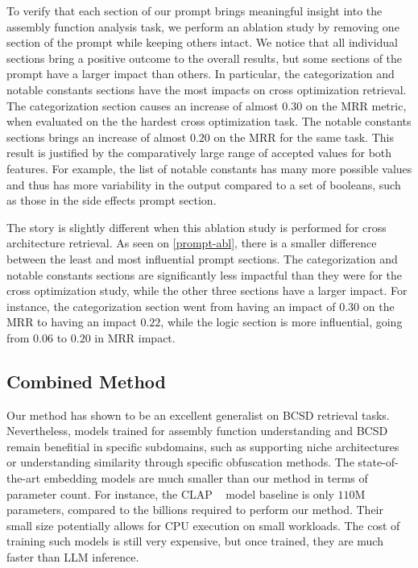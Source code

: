 To verify that each section of our prompt brings meaningful insight into the assembly function analysis task, we perform an ablation
study by removing one section of the prompt while keeping others intact. We notice that all individual sections bring a positive
outcome to the overall results, but some sections of the prompt have a larger impact than others. In particular, the categorization and
notable constants sections have the most impacts on cross optimization retrieval. The categorization section causes an increase of almost
\(0.30\) on the MRR metric, when evaluated on the the hardest cross optimization task. The notable constants sections brings an increase of
almost \(0.20\) on the MRR for the same task. This result is justified by the comparatively large range of accepted values for both features.
For example, the list of notable constants has many more possible values and thus has more variability in the output compared to a set
of booleans, such as those in the side effects prompt section.

The story is slightly different when this ablation study is performed for cross architecture retrieval. As seen on \autoref{prompt-abl},
there is a smaller difference between the least and most influential prompt sections. The categorization and notable constants sections
are significantly less impactful than they were for the cross optimization study, while the other three sections have a larger impact.
For instance, the categorization section went from having an impact of \(0.30\) on the MRR to having an impact \(0.22\), while the logic
section is more influential, going from \(0.06\) to \(0.20\) in MRR impact.

\subsection{Combined Method}

Our method has shown to be an excellent generalist on BCSD retrieval tasks. Nevertheless, models trained for assembly function understanding
and BCSD remain benefitial in specific subdomains, such as supporting niche architectures or understanding similarity through
specific obfuscation methods. The state-of-the-art embedding models are much smaller than our method in terms of parameter count.
For instance, the CLAP ~\cite{CLAP} model baseline is only \(110\)M parameters, compared to the billions required to perform our method.
Their small size potentially allows for CPU execution on small workloads. The cost of training such models is still very expensive,
but once trained, they are much faster than LLM inference.

